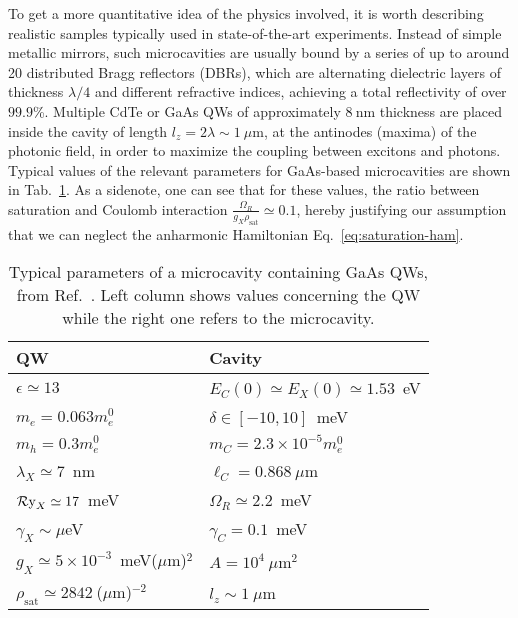 
To get a more quantitative idea of the physics involved, it is worth
describing realistic samples typically used in state-of-the-art
experiments. Instead of simple metallic mirrors, such microcavities
are usually bound by a series of up to around 20 distributed Bragg
reflectors (DBRs), which are alternating dielectric layers of
thickness $\lambda/4$ and different refractive indices, achieving a
total reflectivity of over $99.9$\%. Multiple CdTe or GaAs QWs of
approximately $8~$nm thickness are placed inside the cavity of length
$l_z = 2\lambda \sim 1~\mu$m, at the antinodes (maxima) of the
photonic field, in order to maximize the coupling between excitons and
photons. Typical values of the relevant parameters for GaAs-based
microcavities are shown in Tab.~\ref{tab:GaAs-params}. As a sidenote,
one can see that for these values, the ratio between saturation and
Coulomb interaction
$\frac{\Omega_R}{g_X \rho_{\text{sat}}} \simeq 0.1$, hereby justifying
our assumption that we can neglect the anharmonic Hamiltonian
Eq.~\eqref{eq:saturation-ham}.
%
\begin{table}
  \centering
  \begin{tabular}{@{}ll@{}} \toprule
    QW & Cavity \\ \midrule
    $\epsilon \simeq 13$ &  $E_C(0) \simeq E_X(0) \simeq 1.53$~eV\\
    $m_e = 0.063m^0_e$    &  $\delta \in [-10,10]$~meV\\
    $m_h = 0.3m^0_e$      &  $m_{C} = 2.3\times 10^{-5} m^0_e$ \\
    $\lambda_X \simeq 7$~nm   & $\ell_{C} = 0.868~\mu$m\\
    $\operatorname{\mathcal{R}y}_X \simeq 17$~meV &  $\Omega_R \simeq 2.2$~meV \\
    $\gamma_X \sim \mu$eV &  $\gamma_C = 0.1$~meV \\ 
    $g_X \simeq 5\times10^{-3}$~meV($\mu$m)$^2$ &  $A = 10^4~\mu$m$^2$\\
    $\rho_{\text{sat}} \simeq 2842~$($\mu$m)$^{-2}$ &  $l_z \sim 1~\mu$m\\ \bottomrule
  \end{tabular}
  \caption{Typical parameters of a microcavity containing GaAs QWs, from Ref.~\cite{9783642241857}. Left column shows values concerning the QW while the right one refers to the microcavity.}
  \label{tab:GaAs-params}
\end{table}
%







